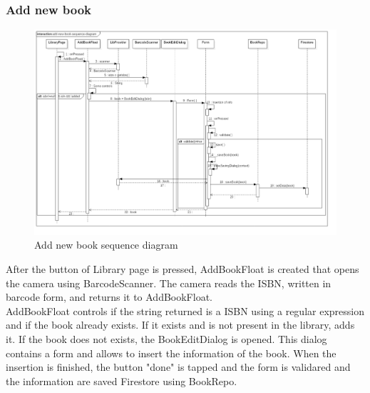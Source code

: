 \subsubsection{Add new book}
\begin{figure}[!h]
    \centering
    \includegraphics[scale=0.35]{images/add-new-book-sequence-diagram.png}
    \caption{Add new book sequence diagram}
    \label{ref:addnewbooksequencediagram}
\end{figure}
After the button of Library page is pressed, AddBookFloat is created that opens the camera using BarcodeScanner. 
The camera reads the ISBN, written in barcode form, and returns it to AddBookFloat.\\ 
AddBookFloat controls if the string returned is a ISBN using a regular expression and if the book already exists. 
If it exists and is not present in the library, adds it. If the book does not exists, the BookEditDialog is opened. 
This dialog contains a form and allows to insert the information of the book. 
When the insertion is finished, the button "done" is tapped and the form is validared and the information are saved 
Firestore using BookRepo. 
